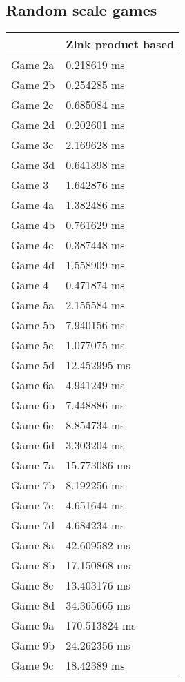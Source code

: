 \subsection{Random scale games}
\begin{tabular}{|l|l|}
	\hline
	& Zlnk product based \\ \hline
	Game 2a & 0.218619 ms \\ \hline
	Game 2b & 0.254285 ms \\ \hline
	Game 2c & 0.685084 ms \\ \hline
	Game 2d & 0.202601 ms \\ \hline
	Game 3c & 2.169628 ms \\ \hline
	Game 3d & 0.641398 ms \\ \hline
	Game 3 & 1.642876 ms \\ \hline
	Game 4a & 1.382486 ms \\ \hline
	Game 4b & 0.761629 ms \\ \hline
	Game 4c & 0.387448 ms \\ \hline
	Game 4d & 1.558909 ms \\ \hline
	Game 4 & 0.471874 ms \\ \hline
	Game 5a & 2.155584 ms \\ \hline
	Game 5b & 7.940156 ms \\ \hline
	Game 5c & 1.077075 ms \\ \hline
	Game 5d & 12.452995 ms \\ \hline
	Game 6a & 4.941249 ms \\ \hline
	Game 6b & 7.448886 ms \\ \hline
	Game 6c & 8.854734 ms \\ \hline
	Game 6d & 3.303204 ms \\ \hline
	Game 7a & 15.773086 ms \\ \hline
	Game 7b & 8.192256 ms \\ \hline
	Game 7c & 4.651644 ms \\ \hline
	Game 7d & 4.684234 ms \\ \hline
	Game 8a & 42.609582 ms \\ \hline
	Game 8b & 17.150868 ms \\ \hline
	Game 8c & 13.403176 ms \\ \hline
	Game 8d & 34.365665 ms \\ \hline
	Game 9a & 170.513824 ms \\ \hline
	Game 9b & 24.262356 ms \\ \hline
	Game 9c & 18.42389 ms \\ \hline

\end{tabular}
